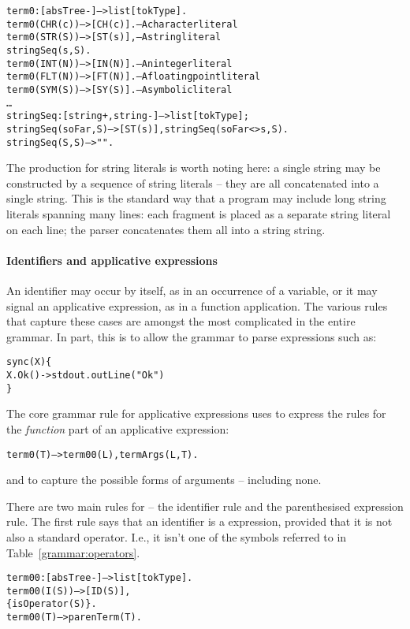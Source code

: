 \begin{alltt}
term0:[absTree-]-->list[tokType].
term0(CHR(c)) --> [CH(c)].       -- A character literal
term0(STR(S)) --> [ST(s)],       -- A string literal
    stringSeq(s,S).
term0(INT(N)) --> [IN(N)].       -- An integer literal
term0(FLT(N)) --> [FT(N)].       -- A floating point literal
term0(SYM(S)) --> [SY(S)].       -- A symbolic literal
\ldots
stringSeq:[string+,string-]-->list[tokType];
stringSeq(soFar,S) --> [ST(s)], stringSeq(soFar<>s,S).
stringSeq(S,S) --> "".
\end{alltt}
The production for string literals is worth noting here: a single string may be constructed by a sequence of string literals -- they are all concatenated into a single string. This is the standard way that a \go program may include long string literals spanning many lines: each fragment is placed as a separate string literal on each line; the parser concatenates them all into a string string.
     
\paragraph{Identifiers and applicative expressions}
An identifier may occur by itself, as in an occurrence of a variable, or it may signal an applicative expression, as in a function application. The various rules that capture these cases are amongst the most complicated in the entire \go grammar. In part, this is to allow the grammar to parse expressions such as:
\begin{alltt}
sync(X)\{
  X.Ok() -> stdout.outLine("Ok")
\}
\end{alltt}

The core grammar rule for applicative expressions uses  to express the rules for the \emph{function} part of an applicative expression:
\begin{alltt}
term0(T) --> term00(L), termArgs(L,T).
\end{alltt}
and  to capture the possible forms of arguments -- including none.

There are two main rules for  -- the identifier rule and the parenthesised expression rule. The first rule says that an identifier is a  expression, provided that it is not also a standard operator. I.e., it isn't one of the symbols referred to in Table~\vref{grammar:operators}. 
\begin{alltt}
term00:[absTree-]-->list[tokType].
term00(I(S)) --> [ID(S)],
    \{\nasf{}isOperator(S)\}.
term00(T) --> parenTerm(T).
\end{alltt}

